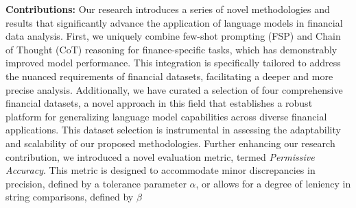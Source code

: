 \documentclass[logo,msc]{infthesis}           %
\begin{document}
\begin{comment}
Our experiment sought to validate the prevailing belief that larger models with specialized fine-tuning enhance performance, particularly in the domain of code generation for financial analysis. The study demonstrated that reducing error rates in code generation significantly influences accuracy. This progression in our experiments underscores that achieving state-of-the-art (SOTA) performance in handling numerical data and calculations is feasible through the strategic selection of models optimized for low-error code generation or through the meticulous fine-tuning of comparable models, such as the 13b variant, to enhance their code generation proficiency. Specifically, these models showed improved ability to generate responses that could seamlessly integrate with external tools or Python's functions, demonstrating their utility in complex computational tasks. This research not only contributes to the expanding corpus of knowledge at the nexus of natural language processing (NLP) and financial analytics but also prompts critical inquiries into the scalability of Large Language Models (LLMs) in financial applications, the effectiveness of fine-tuning strategies, and the ideal equilibrium among model size, computational efficiency, and analytical precision. By navigating these challenges, our study establishes a solid groundwork for future explorations, potentially catalyzing breakthroughs in the methodologies employed for sophisticated financial analyses with open-source LLMs.
\end{comment}
\textbf{Contributions:} Our research introduces a series of novel methodologies and results that significantly advance the application of language models in financial data analysis. First, we uniquely combine few-shot prompting (FSP) and Chain of Thought (CoT) reasoning for finance-specific tasks, which has demonstrably improved model performance. This integration is specifically tailored to address the nuanced requirements of financial datasets, facilitating a deeper and more precise analysis. Additionally, we have curated a selection of four comprehensive financial datasets, a novel approach in this field that establishes a robust platform for generalizing language model capabilities across diverse financial applications. This dataset selection is instrumental in assessing the adaptability and scalability of our proposed methodologies. Further enhancing our research contribution, we introduced a novel evaluation metric, termed \textit{Permissive Accuracy}. This metric is designed to accommodate minor discrepancies in precision, defined by a tolerance parameter $\alpha$, or allows for a degree of leniency in string comparisons, defined by $\beta$
\end{document}
